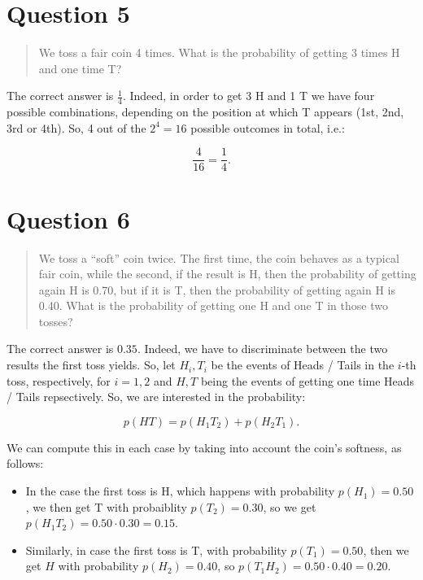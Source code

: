 \documentclass[
]{article}
\providecommand{\tightlist}{%
  \setlength{\itemsep}{0pt}\setlength{\parskip}{0pt}}
\begin{document}
\section{Question 5}\label{question-5}

\begin{quote}
We toss a fair coin 4 times. What is the probability of getting 3 times
H and one time T?
\end{quote}

The correct answer is \(\frac{1}{4}\). Indeed, in order to get 3 H and 1
T we have four possible combinations, depending on the position at which
T appears (1st, 2nd, 3rd or 4th). So, 4 out of the \(2^4=16\) possible
outcomes in total, i.e.:

\[\frac{4}{16}=\frac{1}{4}.\]

\section{Question 6}\label{question-6}

\begin{quote}
We toss a ``soft'' coin twice. The first time, the coin behaves as a
typical fair coin, while the second, if the result is H, then the
probability of getting again H is 0.70, but if it is T, then the
probability of getting again H is 0.40. What is the probability of
getting one H and one T in those two tosses?
\end{quote}

The correct answer is \(0.35\). Indeed, we have to discriminate between
the two results the first toss yields. So, let \(H_i,T_i\) be the events
of Heads / Tails in the \(i\)-th toss, respectively, for \(i=1,2\) and
\(H,T\) being the events of getting one time Heads / Tails repsectively.
So, we are interested in the probability:

\[p(HT)=p(H_1T_2)+p(H_2T_1).\]

We can compute this in each case by taking into account the coin's
softness, as follows:

\begin{itemize}
\tightlist
\item
  In the case the first toss is H, which happens with probability
  \(p(H_1)=0.50\), we then get T with probaiblity \(p(T_2)=0.30\), so we
  get \(p(H_1T_2)=0.50\cdot 0.30=0.15\).
\item
  Similarly, in case the first toss is T, with probability
  \(p(T_1)=0.50\), then we get \(H\) with probability \(p(H_2)=0.40\),
  so \(p(T_1H_2)=0.50\cdot0.40=0.20\).
\end{itemize}
\end{document}
